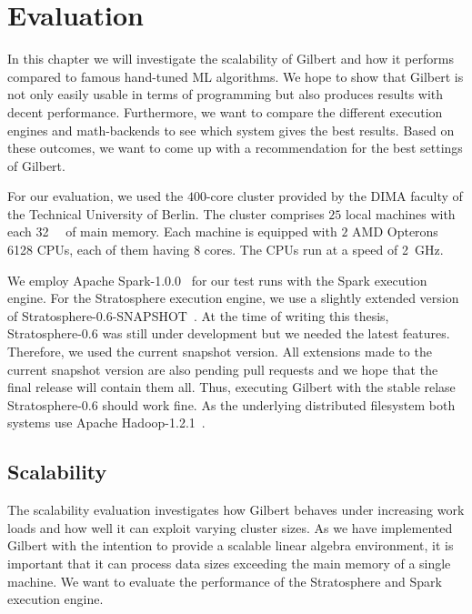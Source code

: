 \chapter{Evaluation}
\label{cha:evaluation}


In this chapter we will investigate the scalability of Gilbert and how it performs compared to famous hand-tuned ML algorithms.
We hope to show that Gilbert is not only easily usable in terms of programming but also produces results with decent performance.
Furthermore, we want to compare the different execution engines and math-backends to see which system gives the best results.
Based on these outcomes, we want to come up with a recommendation for the best settings of Gilbert.

For our evaluation, we used the $400$-core cluster provided by the DIMA faculty of the Technical University of Berlin.
The cluster comprises $25$ local machines with each \SI{32}{\giga\byte} of main memory.
Each machine is equipped with $2$ AMD Opterons 6128 CPUs, each of them having $8$ cores.
The CPUs run at a speed of \SI{2}{\giga\hertz}.

We employ Apache Spark-1.0.0~\cite{spark} for our test runs with the Spark execution engine.
For the Stratosphere execution engine, we use a slightly extended version of Stratosphere-0.6-SNAPSHOT~\cite{stratosphere}.
At the time of writing this thesis, Stratosphere-0.6 was still under development but we needed the latest features.
Therefore, we used the current snapshot version.
All extensions made to the current snapshot version are also pending pull requests and we hope that the final release will contain them all.
Thus, executing Gilbert with the stable relase Stratosphere-0.6 should work fine.
As the underlying distributed filesystem both systems use Apache Hadoop-1.2.1~\cite{hadoop:2008a}.

\section{Scalability}

The scalability evaluation investigates how Gilbert behaves under increasing work loads and how well it can exploit varying cluster sizes.
As we have implemented Gilbert with the intention to provide a scalable linear algebra environment, it is important that it can process data sizes exceeding the main memory of a single machine.
We want to evaluate the performance of the Stratosphere and Spark execution engine.

